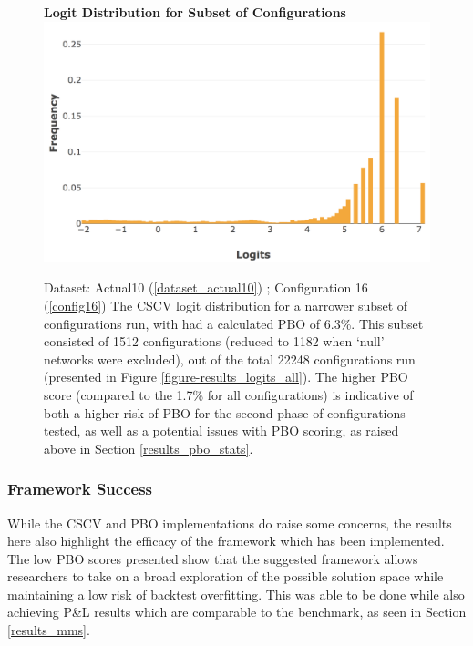 \documentclass[a4paper,11pt,oneside]{article}
\theoremstyle{plain}
\theoremstyle{definition}
\begin{document}
	\begin{figure}[H]
		\centering 
		\textbf{Logit Distribution for Subset of Configurations}
		\includegraphics[scale=0.4]{images/results/8_9_pbo/subset_dist.png} 
		\caption[Logit Distribution for Subset of Configurations]{Dataset: Actual10 (\ref{dataset_actual10}) ; Configuration 16 (\ref{config16})
			\newline The CSCV logit distribution for a narrower subset of configurations run, with had a calculated PBO of 6.3\%. This subset consisted of 1512 configurations (reduced to 1182 when `null' networks were excluded), out of the total 22248 configurations run (presented in Figure \ref{figure-results_logits_all}). The higher PBO score (compared to the 1.7\% for all configurations) is indicative of both a higher risk of PBO for the second phase of configurations tested, as well as a potential issues with PBO scoring, as raised above in Section \ref{results_pbo_stats}.}
		\label{figure-results_logits_subset}
	\end{figure}
	
	
	\subsubsection{Framework Success}
	
	
	While the CSCV and PBO implementations do raise some concerns, the results here also highlight the efficacy of the framework which has been implemented. The low PBO scores presented show that the suggested framework allows researchers to take on a broad exploration of the possible solution space while maintaining a low risk of backtest overfitting. This was able to be done while also achieving P\&L results which are comparable to the benchmark, as seen in Section \ref{results_mms}.
	
\end{document}
